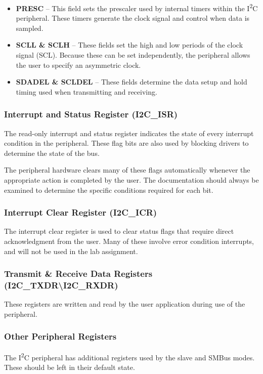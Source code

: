 \documentclass[11pt,fleqn]{book} %
\begin{document}
    \begin{itemize}
        \item \textbf{PRESC} -- This field sets the prescaler used by internal timers within the I\textsuperscript{2}C peripheral. These timers generate the clock signal and control when data is sampled.  
        \item \textbf{SCLL \& SCLH} -- These fields set the high and low periods of the clock signal (SCL). Because these can be set independently, the peripheral allows the user to specify an asymmetric clock. 
        \item \textbf{SDADEL \& SCLDEL} -- These fields determine the data setup and hold timing used when transmitting and receiving. 
    \end{itemize}

    \subsubsection{Interrupt and Status Register (I2C\_ISR)}
    The read-only interrupt and status register indicates the state of every interrupt condition in the peripheral. These flag bits are also used by blocking drivers to determine the state of the bus.
    
    The peripheral hardware clears many of these flags automatically whenever the appropriate action is completed by the user. The documentation should always be examined to determine the specific conditions required for each bit. 
    \subsubsection{Interrupt Clear Register (I2C\_ICR)}
    The interrupt clear register is used to clear status flags that require direct acknowledgment from the user. Many of these involve error condition interrupts, and will not be used in the lab assignment.
    
    \subsubsection{Transmit \& Receive Data Registers (I2C\_TXDR{\textbackslash}I2C\_RXDR)}
    These registers are written and read by the user application during use of the peripheral. 
    
    \subsubsection{Other Peripheral Registers}
    The I\textsuperscript{2}C peripheral has additional registers used by the slave and SMBus modes. These should be left in their default state.
\end{document}
